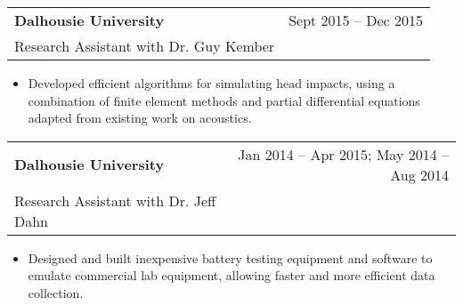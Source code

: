 \documentclass{article}
\begin{document}
\begin{center}
\begin{tabularx}{\textwidth}{Xr}
	\textbf{Dalhousie University}	& Sept 2015 -- Dec 2015 \\
	Research Assistant with Dr. Guy Kember
\end{tabularx}
\end{center}
\begin{itemize}
	\item Developed efficient algorithms for simulating head impacts, using a combination of finite element methods and partial differential equations adapted from existing work on acoustics.
\end{itemize}

\begin{center}
\begin{tabularx}{\textwidth}{Xr}
	\textbf{Dalhousie University}	& 
	Jan 2014 -- Apr 2015; May 2014 -- Aug 2014 \\
	Research Assistant with Dr. Jeff Dahn
\end{tabularx}
\end{center}
\begin{itemize}
	\item Designed and built inexpensive battery testing equipment and software to emulate commercial lab equipment, allowing faster and more efficient data collection.
\end{itemize}
\end{document}
